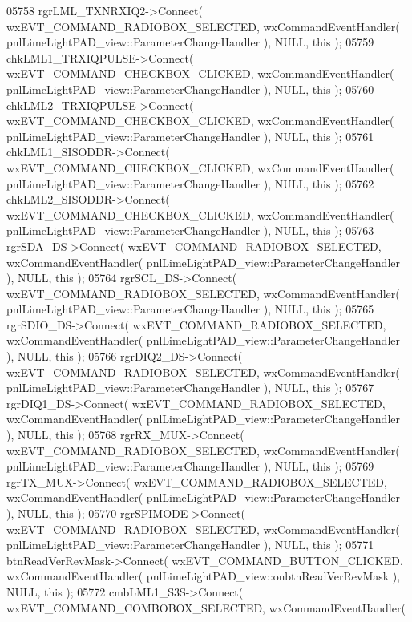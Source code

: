 \begin{DoxyCode}
05758     rgrLML_TXNRXIQ2->Connect( wxEVT\_COMMAND\_RADIOBOX\_SELECTED, wxCommandEventHandler( 
      pnlLimeLightPAD_view::ParameterChangeHandler ), NULL, \textcolor{keyword}{this} );
05759     chkLML1_TRXIQPULSE->Connect( wxEVT\_COMMAND\_CHECKBOX\_CLICKED, wxCommandEventHandler( 
      pnlLimeLightPAD_view::ParameterChangeHandler ), NULL, \textcolor{keyword}{this} );
05760     chkLML2_TRXIQPULSE->Connect( wxEVT\_COMMAND\_CHECKBOX\_CLICKED, wxCommandEventHandler( 
      pnlLimeLightPAD_view::ParameterChangeHandler ), NULL, \textcolor{keyword}{this} );
05761     chkLML1_SISODDR->Connect( wxEVT\_COMMAND\_CHECKBOX\_CLICKED, wxCommandEventHandler( 
      pnlLimeLightPAD_view::ParameterChangeHandler ), NULL, \textcolor{keyword}{this} );
05762     chkLML2_SISODDR->Connect( wxEVT\_COMMAND\_CHECKBOX\_CLICKED, wxCommandEventHandler( 
      pnlLimeLightPAD_view::ParameterChangeHandler ), NULL, \textcolor{keyword}{this} );
05763     rgrSDA_DS->Connect( wxEVT\_COMMAND\_RADIOBOX\_SELECTED, wxCommandEventHandler( 
      pnlLimeLightPAD_view::ParameterChangeHandler ), NULL, \textcolor{keyword}{this} );
05764     rgrSCL_DS->Connect( wxEVT\_COMMAND\_RADIOBOX\_SELECTED, wxCommandEventHandler( 
      pnlLimeLightPAD_view::ParameterChangeHandler ), NULL, \textcolor{keyword}{this} );
05765     rgrSDIO_DS->Connect( wxEVT\_COMMAND\_RADIOBOX\_SELECTED, wxCommandEventHandler( 
      pnlLimeLightPAD_view::ParameterChangeHandler ), NULL, \textcolor{keyword}{this} );
05766     rgrDIQ2_DS->Connect( wxEVT\_COMMAND\_RADIOBOX\_SELECTED, wxCommandEventHandler( 
      pnlLimeLightPAD_view::ParameterChangeHandler ), NULL, \textcolor{keyword}{this} );
05767     rgrDIQ1_DS->Connect( wxEVT\_COMMAND\_RADIOBOX\_SELECTED, wxCommandEventHandler( 
      pnlLimeLightPAD_view::ParameterChangeHandler ), NULL, \textcolor{keyword}{this} );
05768     rgrRX_MUX->Connect( wxEVT\_COMMAND\_RADIOBOX\_SELECTED, wxCommandEventHandler( 
      pnlLimeLightPAD_view::ParameterChangeHandler ), NULL, \textcolor{keyword}{this} );
05769     rgrTX_MUX->Connect( wxEVT\_COMMAND\_RADIOBOX\_SELECTED, wxCommandEventHandler( 
      pnlLimeLightPAD_view::ParameterChangeHandler ), NULL, \textcolor{keyword}{this} );
05770     rgrSPIMODE->Connect( wxEVT\_COMMAND\_RADIOBOX\_SELECTED, wxCommandEventHandler( 
      pnlLimeLightPAD_view::ParameterChangeHandler ), NULL, \textcolor{keyword}{this} );
05771     btnReadVerRevMask->Connect( wxEVT\_COMMAND\_BUTTON\_CLICKED, wxCommandEventHandler( 
      pnlLimeLightPAD_view::onbtnReadVerRevMask ), NULL, \textcolor{keyword}{this} );
05772     cmbLML1_S3S->Connect( wxEVT\_COMMAND\_COMBOBOX\_SELECTED, wxCommandEventHandler( 

\end{DoxyCode}
